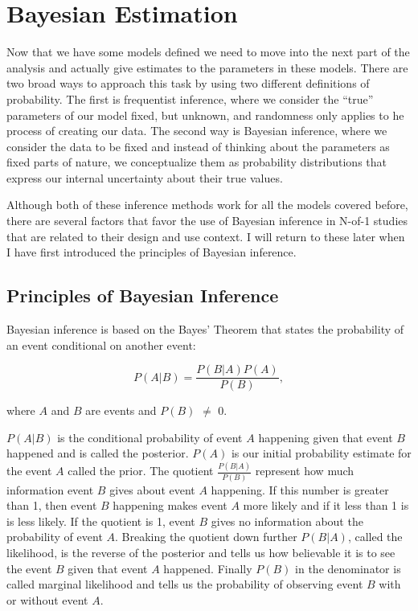 \documentclass[12pt,a4paper,leqno]{report}
\theoremstyle{plain}
\theoremstyle{definition}
\theoremstyle{remark}
\begin{document}
\chapter{Bayesian Estimation}\label{bayes}

Now that we have some models defined we need to move into the next part of the analysis
and actually give estimates to the parameters in these models. There are two broad ways
to approach this task by using two different definitions of probability. The first is
frequentist inference, where we consider the ``true'' parameters of our model fixed, but
unknown, and randomness only applies to he process of creating our data. The second way
is Bayesian inference, where we consider the data to be fixed and instead of thinking
about the parameters as fixed parts of nature, we conceptualize them as probability
distributions that express our internal uncertainty about their true values.

Although both of these inference methods work for all the models covered before, there
are several factors that favor the use of Bayesian inference in N-of-1 studies that are
related to their design and use context. I will return to these later when I have first
introduced the principles of Bayesian inference.

\section{Principles of Bayesian Inference}\label{whybayes}

Bayesian inference is based on the Bayes' Theorem that states the probability of an event
conditional on another event:

\begin{def}\label{bayesrule}
    \begin{equation}
        P(A|B) = \frac{P(B|A)P(A)}{P(B)},
    \end{equation}
\end{def}where \(A\) and \(B\) are events and \(P(B)\) \(\neq \) 0.

\(P(A|B)\) is the conditional probability of event \(A\) happening given that event \(B\)
happened and is called the posterior. \(P(A)\) is our initial probability estimate for
the event \(A\) called the prior. The quotient \(\frac{P(B|A)}{P(B)}\) represent how much
information event \(B\) gives about event \(A\) happening. If this number is greater than
1, then event \(B\) happening makes event \(A\) more likely and if it less than 1 is is
less likely. If the quotient is 1, event \(B\) gives no information about the probability
of event \(A\). Breaking the quotient down further \(P(B|A)\), called the likelihood, is
the reverse of the posterior and tells us how believable it is to see the event \(B\)
given that event \(A\) happened. Finally \(P(B)\) in the denominator is called marginal
likelihood and tells us the probability of observing event \(B\) with or without event
\(A\).
\end{document}
